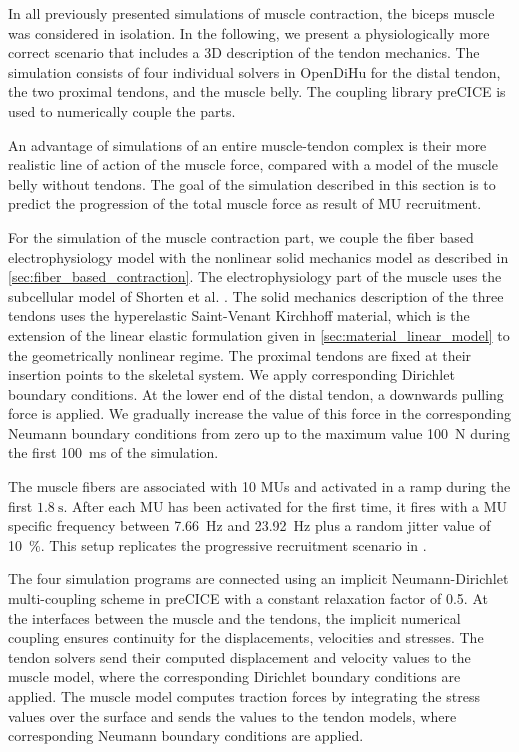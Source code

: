 In all previously presented simulations of muscle contraction, the biceps muscle was considered in isolation. In the following, we present a  physiologically more correct scenario that includes a 3D description of the tendon mechanics.
The simulation consists of four individual solvers in OpenDiHu for the distal tendon, the two proximal tendons, and the muscle belly.
The coupling library preCICE is used to numerically couple the parts.

An advantage of simulations of an entire muscle-tendon complex is their more realistic line of action of the muscle force, compared with a model of the muscle belly without tendons. The goal of the simulation described in this section is to predict the progression of the total muscle force as  result of MU recruitment.

For the simulation of the muscle contraction part, we couple the fiber based electrophysiology model with the nonlinear solid mechanics model as described in \cref{sec:fiber_based_contraction}. The electrophysiology part of the muscle uses the subcellular model of Shorten et al. \cite{Shorten2007}. 
The solid mechanics description of the three tendons uses the hyperelastic Saint-Venant Kirchhoff material, which is the extension of the linear elastic formulation given in \cref{sec:material_linear_model} to the geometrically nonlinear regime.
The proximal tendons are fixed at their insertion points to the skeletal system. We apply corresponding Dirichlet boundary conditions. At the lower end of the distal tendon, a downwards pulling force is applied. We gradually increase the value of this force in the corresponding Neumann boundary conditions from zero up to the maximum value \SI{100}{\newton} during the first \SI{100}{\ms} of the simulation.

The muscle fibers are associated with 10 MUs and activated in a ramp during the first $\SI{1.8}{\s}$. After each MU has been activated for the first time, it fires with a MU specific frequency between \SI{7.66}{\hertz} and \SI{23.92}{\hertz} plus a random jitter value of \SI{10}{\percent}. This setup replicates the progressive recruitment scenario in \cite{Klotz2020}.

The four simulation programs are connected using an implicit Neumann-Dirichlet multi-coupling scheme in preCICE with a constant relaxation factor of 0.5. At the interfaces between the muscle and the tendons, the implicit numerical coupling ensures continuity for the displacements, velocities and stresses.
The tendon solvers send their computed displacement and velocity values to the muscle model, where the corresponding Dirichlet boundary conditions are applied. The muscle model computes traction forces by integrating the stress values over the surface and sends the values to the tendon models, where corresponding Neumann boundary conditions are applied. 

